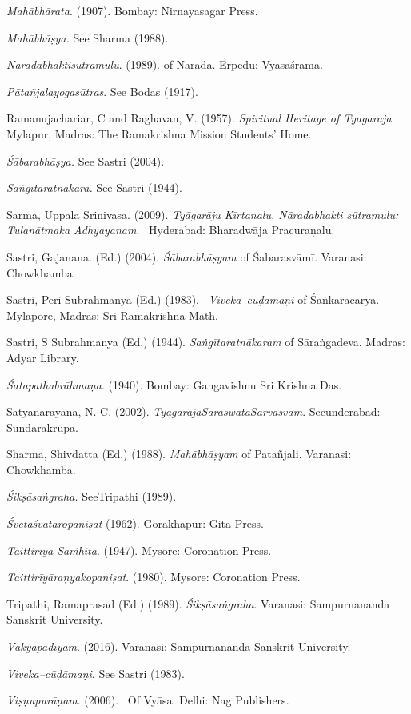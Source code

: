 \begin{thebibliography}{99}
  \textit{Mahābhārata}. (1907). Bombay: Nirnayasagar Press. 

  \textit{Mahābhāṣya.} See Sharma (1988).

  \textit{Naradabhaktisūtramulu}. (1989). of Nārada. Erpedu: Vyāsāśrama.

  \textit{Pātañjalayogasūtras}. See Bodas (1917).

  Ramanujachariar, C and Raghavan, V. (1957). \textit{Spiritual Heritage of Tyagaraja}. Mylapur, Madras: The Ramakrishna Mission Students’ Home.

  \textit{Śābarabhāṣya.} See Sastri (2004).

  \textit{Saṅgītaratnākara.} See Sastri (1944).

  Sarma, Uppala Srinivasa. (2009). \textit{Tyāgarāju Kīrtanalu, Nāradabhakti sūtramulu: Tulanātmaka Adhyayanam}.  Hyderabad: Bharadwāja Pracuraṇalu.

  Sastri, Gajanana. (Ed.) (2004). \textit{Śābarabhāṣyam} of Śabarasvāmī. Varanasi: Chowkhamba.

  Sastri, Peri Subrahmanya (Ed.) (1983).  \textit{Viveka–cūḍāmaṇi} of Śaṅkarācārya. Mylapore, Madras: Sri Ramakrishna Math.

  Sastri, S Subrahmanya (Ed.) (1944). \textit{Saṅgītaratnākaram} of Sāraṅgadeva. Madras: Adyar Library. 

  \textit{Śatapathabrāhmaṇa}. (1940). Bombay: Gangavishnu Sri Krishna Das.

  Satyanarayana, N. C. (2002). \textit{TyāgarājaSāraswataSarvasvam}. Secunderabad: Sundarakrupa. 

  Sharma, Shivdatta (Ed.) (1988). \textit{Mahābhāṣyam} of Patañjali. Varanasi: Chowkhamba.

  \textit{Śikṣāsaṅgraha.} SeeTripathi (1989).

  \textit{Śvetāśvataropaniṣat} (1962). Gorakhapur: Gita Press.

  \textit{Taittirīya Saṁhitā}. (1947). Mysore: Coronation Press.

  \textit{Taittirīyāraṇyakopaniṣat}. (1980). Mysore: Coronation Press. 

  Tripathi, Ramaprasad (Ed.) (1989). \textit{Śikṣāsaṅgraha}. Varanasi: Sampurnananda Sanskrit University. 

  \textit{Vākyapadīyam}. (2016). Varanasi: Sampurnananda Sanskrit University.

  \textit{Viveka–cūḍāmaṇi}. See Sastri (1983).

  \textit{Viṣṇupurāṇam}. (2006).  Of Vyāsa. Delhi: Nag Publishers. \\

 \end{thebibliography}

\theendnotes

